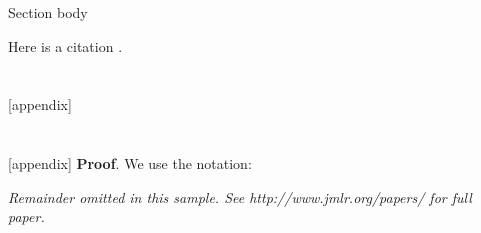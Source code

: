 \documentclass[twoside,11pt]{article}
\begin{document}
Section body

Here is a citation \cite{chow:68}.




\newpage

\appendix
\section{}
\label{app:theorem}



[appendix]

\section{}

[appendix]
\noindent
{\bf Proof}. We use the notation:

{\noindent \em Remainder omitted in this sample. See http://www.jmlr.org/papers/ for full paper.}


\vskip 0.2in

\end{document}

